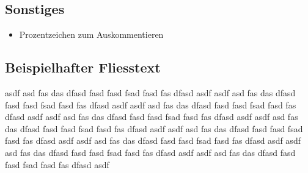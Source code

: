 \documentclass[11pt]{report}
\begin{document}
\subsection{Sonstiges}
\begin{itemize}[leftmargin=*]
  \item Prozentzeichen zum Auskommentieren 
\end{itemize}

\subsection{Beispielhafter Fliesstext}
asdf asd fas das dfasd fasd fasd fsad fasd fas dfasd asdf asdf asd fas das dfasd fasd fasd fsad fasd fas dfasd asdf asdf asd fas das dfasd fasd fasd fsad fasd fas dfasd asdf asdf asd fas das dfasd fasd fasd fsad fasd fas dfasd asdf asdf asd fas das dfasd fasd fasd fsad fasd fas dfasd asdf asdf asd fas das dfasd fasd fasd fsad fasd fas dfasd asdf asdf asd fas das dfasd fasd fasd fsad fasd fas dfasd asdf asdf asd fas das dfasd fasd fasd fsad fasd fas dfasd asdf asdf asd fas das dfasd fasd fasd fsad fasd fas dfasd asdf 
\end{document}
